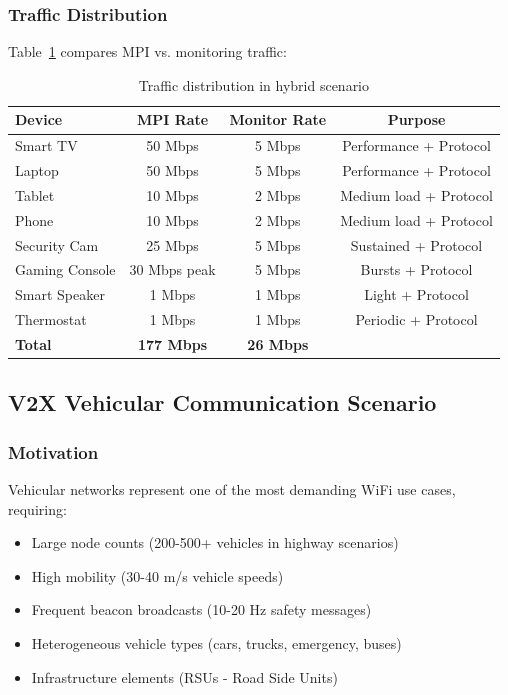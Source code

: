 \subsubsection{Traffic Distribution}

Table~\ref{tab:hybrid-traffic} compares MPI vs. monitoring traffic:

\begin{table}[htbp]
\centering
\caption{Traffic distribution in hybrid scenario}
\label{tab:hybrid-traffic}
\small
\begin{tabular}{@{}lccc@{}}
\toprule
\textbf{Device} & \textbf{MPI Rate} & \textbf{Monitor Rate} & \textbf{Purpose} \\
\midrule
Smart TV & 50 Mbps & 5 Mbps & Performance + Protocol \\
Laptop & 50 Mbps & 5 Mbps & Performance + Protocol \\
Tablet & 10 Mbps & 2 Mbps & Medium load + Protocol \\
Phone & 10 Mbps & 2 Mbps & Medium load + Protocol \\
Security Cam & 25 Mbps & 5 Mbps & Sustained + Protocol \\
Gaming Console & 30 Mbps peak & 5 Mbps & Bursts + Protocol \\
Smart Speaker & 1 Mbps & 1 Mbps & Light + Protocol \\
Thermostat & 1 Mbps & 1 Mbps & Periodic + Protocol \\
\midrule
\textbf{Total} & \textbf{177 Mbps} & \textbf{26 Mbps} & \\
\bottomrule
\end{tabular}
\end{table}

\subsection{V2X Vehicular Communication Scenario}

\subsubsection{Motivation}

Vehicular networks represent one of the most demanding WiFi use cases, requiring:
\begin{itemize}
    \item Large node counts (200-500+ vehicles in highway scenarios)
    \item High mobility (30-40 m/s vehicle speeds)
    \item Frequent beacon broadcasts (10-20 Hz safety messages)
    \item Heterogeneous vehicle types (cars, trucks, emergency, buses)
    \item Infrastructure elements (RSUs - Road Side Units)
\end{itemize}

